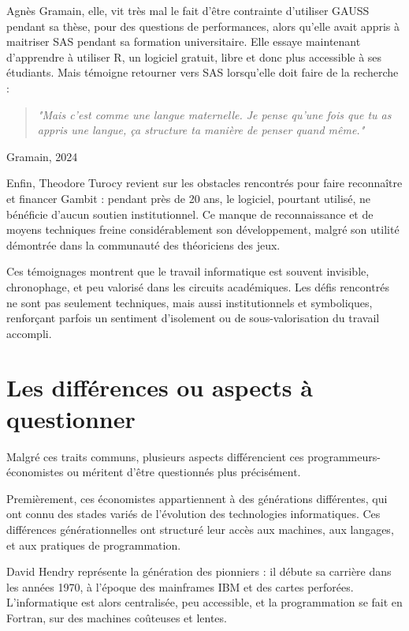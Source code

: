 Agnès Gramain, elle, vit très mal le fait d'être contrainte d’utiliser GAUSS pendant sa thèse, pour des questions de performances, alors qu'elle avait appris à maitriser SAS pendant sa formation universitaire. Elle essaye maintenant d'apprendre à utiliser R, un logiciel gratuit, libre et donc plus accessible à ses étudiants. Mais témoigne retourner vers SAS lorsqu'elle doit faire de la recherche : 
\begin{quote}
\begin{center}
\textit{"Mais c’est comme une langue maternelle. Je pense qu’une fois que tu as appris une langue, ça structure ta manière de penser quand même."}
\end{center}
\end{quote} \hfill Gramain, 2024\cite{gramainInterviewAgnesGramain2024}

Enfin, Theodore Turocy revient sur les obstacles rencontrés pour faire reconnaître et financer Gambit : pendant près de 20 ans, le logiciel, pourtant utilisé, ne bénéficie d’aucun soutien institutionnel. Ce manque de reconnaissance et de moyens techniques freine considérablement son développement, malgré son utilité démontrée dans la communauté des théoriciens des jeux. 

Ces témoignages montrent que le travail informatique est souvent invisible, chronophage, et peu valorisé dans les circuits académiques. Les défis rencontrés ne sont pas seulement techniques, mais aussi institutionnels et symboliques, renforçant parfois un sentiment d’isolement ou de sous-valorisation du travail accompli.


\section{Les différences ou aspects à questionner}

Malgré ces traits communs, plusieurs aspects différencient ces programmeurs-économistes ou méritent d’être questionnés plus précisément.

Premièrement, ces économistes appartiennent à des générations différentes, qui ont connu des stades variés de l’évolution des technologies informatiques. Ces différences générationnelles ont structuré leur accès aux machines, aux langages, et aux pratiques de programmation. 

David Hendry représente la génération des pionniers : il débute sa carrière dans les années 1970, à l’époque des mainframes IBM et des cartes perforées. L’informatique est alors centralisée, peu accessible, et la programmation se fait en Fortran, sur des machines coûteuses et lentes. 


